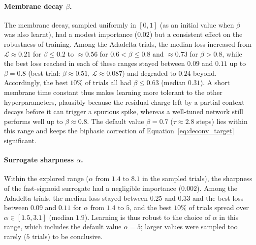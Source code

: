 \documentclass{scrartcl}
\begin{document}

\paragraph{Membrane decay $\beta$.}
The membrane decay, sampled uniformly in $[0, 1]$ (as an initial value when $\beta$ was also learnt), had a modest importance ($0.02$) but a consistent effect on the robustness of training. Among the Adadelta trials, the median loss increased from $\mathcal{L} \approx 0.21$ for $\beta \le 0.2$ to $\approx 0.56$ for $0.6 < \beta \le 0.8$ and $\approx 0.73$ for $\beta > 0.8$, while the best loss reached in each of these ranges stayed between $0.09$ and $0.11$ up to $\beta = 0.8$ (best trial: $\beta \approx 0.51$, $\mathcal{L} \approx 0.087$) and degraded to $0.24$ beyond. Accordingly, the best $10\%$ of trials all had $\beta \le 0.63$ (median $0.31$). A short membrane time constant thus makes learning more tolerant to the other hyperparameters, plausibly because the residual charge left by a partial context decays before it can trigger a spurious spike, whereas a well-tuned network still performs well up to $\beta \approx 0.8$. The default value $\beta = 0.7$ ($\tau \approx 2.8$ steps) lies within this range and keeps the biphasic correction of Equation~\ref{eq:deconv_target} significant.

\paragraph{Surrogate sharpness $\alpha$.}
Within the explored range ($\alpha$ from $1.4$ to $8.1$ in the sampled trials), the sharpness of the fast-sigmoid surrogate had a negligible importance ($0.002$). Among the Adadelta trials, the median loss stayed between $0.25$ and $0.33$ and the best loss between $0.09$ and $0.11$ for $\alpha$ from $1.4$ to $5$, and the best $10\%$ of trials spread over $\alpha \in [1.5, 3.1]$ (median $1.9$). Learning is thus robust to the choice of $\alpha$ in this range, which includes the default value $\alpha = 5$; larger values were sampled too rarely ($5$ trials) to be conclusive.
\end{document}
